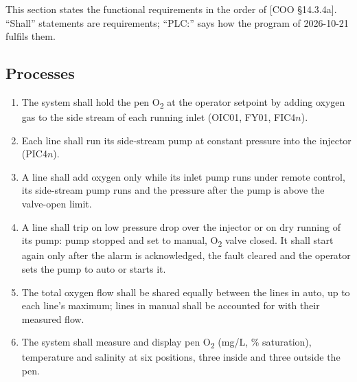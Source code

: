 \documentclass[11pt,a4paper]{article}
\newcommand{\Otwo}{O\textsubscript{2}}
\begin{document}
This section states the functional requirements in the order of [COO \S14.3.4a]. ``Shall''
statements are requirements; ``PLC:'' says how the program of 2026-10-21 fulfils them.

\subsection{Processes}
\begin{enumerate}[label=F\arabic*, nosep]
  \item The system shall hold the pen \Otwo{} at the operator setpoint by adding oxygen gas to the
        side stream of each running inlet (OIC01, FY01, FIC4$n$).
  \item Each line shall run its side-stream pump at constant pressure into the injector (PIC4$n$).
  \item A line shall add oxygen only while its inlet pump runs under remote control, its side-stream
        pump runs and the pressure after the pump is above the valve-open limit.
  \item A line shall trip on low pressure drop over the injector or on dry running of its pump:
        pump stopped and set to manual, \Otwo{} valve closed. It shall start again only after the
        alarm is acknowledged, the fault cleared and the operator sets the pump to auto or starts it.
  \item The total oxygen flow shall be shared equally between the lines in auto, up to each line's
        maximum; lines in manual shall be accounted for with their measured flow.
  \item The system shall measure and display pen \Otwo{} (mg/L, \% saturation), temperature and
        salinity at six positions, three inside and three outside the pen.
\end{enumerate}
\end{document}
